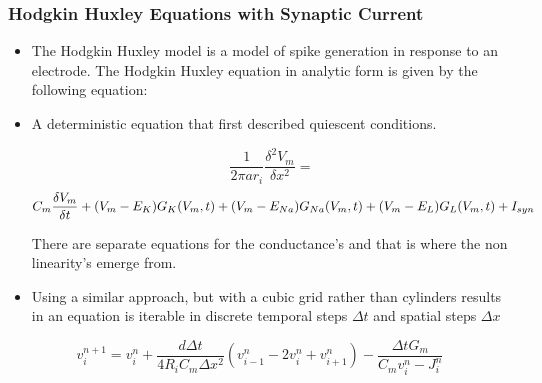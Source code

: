 \documentclass{beamer}
\begin{document}
\begin{frame}
\frametitle{Hodgkin Huxley Equations with Synaptic Current}
\begin{itemize}
\vfill \item The Hodgkin Huxley model is a model of spike generation in response to an electrode. The Hodgkin Huxley equation in analytic form is given by the following equation: 

\vfill \item A deterministic equation that first described quiescent conditions.%


\fontsize{8pt}{8pt}\selectfont$$ 
\frac{1}{2\pi a r_{i}}\frac{\delta ^{2} V_{m}}{\delta x^{2}} =
$$
\begin{equation}
\fontsize{8pt}{8pt}\selectfont 
C_{m} \frac{\delta V_{m}}{\delta t} +(V_{m}-E_{K})G_{K}(V_{m},t)+(V_{m}-E_{Na})G_{Na}(V_{m},t)+(V_{m}-E_{L})G_{L}(V_{m},t) +I_{syn}
\end{equation}

There are separate equations for the conductance's and that is where the non linearity's emerge from.

\vfill \item Using a similar approach, but with a cubic grid rather than cylinders results in an equation is iterable in discrete temporal steps $\Delta t$ and spatial steps $ \Delta x $\\


\end{itemize}


\begin{equation} v^{n+1}_{i}=v^{n}_{i}+\frac{d\Delta t}{4R_{i}C_{m}\Delta x^{2}}(v^{n}_{i-1}-2v^{n}_{i}+v^{n}_{i+1})-\frac{\Delta t G_{m}}{C_{m}v^{n}_{i}-J^{n}_{i}} 
\end{equation}


\end{frame}
\end{document}
